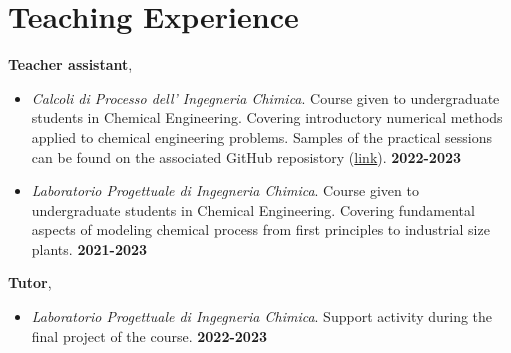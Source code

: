 \section{\sc Teaching Experience}

{\bf Teacher assistant}, \polimi
\vspace*{.05in}
\begin{itemize}
    \item[ ] \textit{Calcoli di Processo dell' Ingegneria Chimica}. Course given to
       undergraduate students in Chemical Engineering. Covering introductory numerical
       methods applied to chemical engineering problems. Samples of the practical sessions
       can be found on the associated GitHub reposistory
        (\href{https://github.com/Titodinelli/Calcoli-di-Processo-dell-Ingegneria-Chimica}{link}).
        \hfill {\bf 2022-2023}

    \item[ ] \textit{Laboratorio Progettuale di Ingegneria Chimica}. Course given to undergraduate
        students in Chemical Engineering. Covering fundamental aspects of modeling chemical process
        from first principles to industrial size plants. \hfill {\bf 2021-2023}
\end{itemize}

{\bf Tutor}, \polimi
\vspace*{.05in}
\begin{itemize}
    \item[ ] \textit{Laboratorio Progettuale di Ingegneria Chimica}. Support activity during the
        final project of the course. \hfill {\bf 2022-2023}
\end{itemize}
